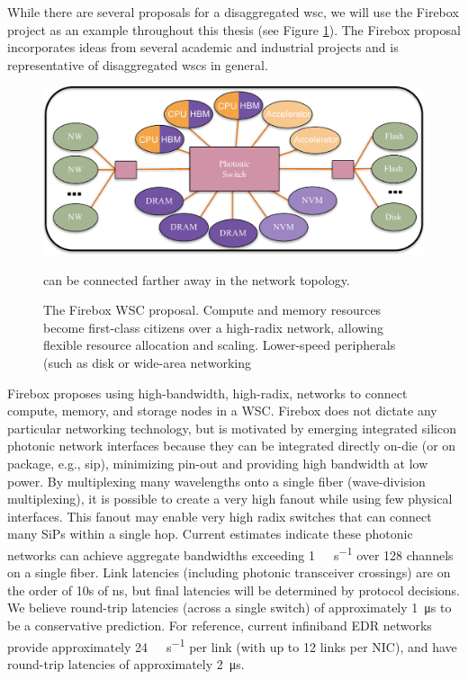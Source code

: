 While there are several proposals for a disaggregated \acrlong{wsc}, we will use the
Firebox\cite{firebox} project as an example throughout this thesis (see Figure
\ref{fig:fb_diagram}). The Firebox proposal incorporates ideas from several academic and industrial projects and is representative of disaggregated \glspl{wsc} in general.

\begin{figure}
    \centering
    \includegraphics[width=0.9\columnwidth]{figs/FBDiagram.pdf} \label{fig:fb_diagram}
    \vspace{-5mm}
    \caption{The Firebox WSC proposal. Compute and memory resources become first-class citizens over a high-radix network, allowing flexible resource allocation and scaling. Lower-speed peripherals (such as disk or wide-area networking} can be connected farther away in the network topology.
\end{figure}

Firebox proposes using high-bandwidth, high-radix, networks to
connect compute, memory, and storage nodes in a WSC. Firebox does not dictate any particular networking technology, but is motivated by emerging integrated silicon photonic network
interfaces because they can be integrated directly on-die (or on package, e.g., \gls{sip}), minimizing pin-out and
providing high bandwidth at low power. By multiplexing many wavelengths onto a
single fiber (wave-division multiplexing), it is possible to create a very high
fanout while using few physical interfaces. This fanout may enable very high
radix switches that can connect many SiPs within a single hop. Current
estimates indicate these photonic networks can achieve aggregate bandwidths
exceeding \SI{1}{\tera\bit\per\second} over 128 channels on a single
fiber\cite{naturePhotonic}\cite{Photonic09}. Link latencies (including photonic
transceiver crossings) are on the order of 10s of \si{\nano\second}, but final
latencies will be determined by protocol decisions. We believe round-trip
latencies (across a single switch) of approximately \SI{1}{\micro\second} to be
a conservative prediction. For reference, current infiniband EDR networks
provide approximately \SI{24}{\giga\bit\per\second} per link (with up to 12
links per NIC), and have round-trip latencies of approximately
\SI{2}{\micro\second}\cite{binnigNW}.

